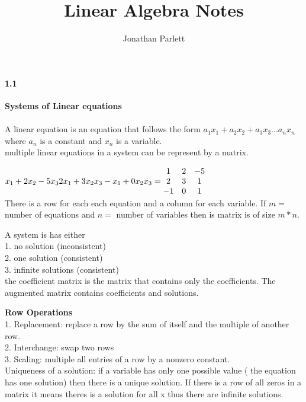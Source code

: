 \documentclass[14pt]{extreport}
\title{Linear Algebra Notes}
\author{Jonathan Parlett}
\begin{document}
\paragraph{1.1}\textbf{Systems of Linear equations}\\\\

A linear equation is an equation that follows the form $a_1x_1 + a_2x_2 + a_3x_3 ... a_nx_n$ where $a_n$ is a constant and $x_n$ is a variable.\\

multiple linear equations in a system can be represent by a matrix.

$
x_1 + 2x_2 -5x_3\\
2x_1 + 3x_2 x_3\\
-x_1 + 0x_2 x_3\\
= 
\begin{matrix}
 1 & 2 & -5\\
 2 & 3 & 1\\
 -1 & 0 & 1\\
 \end{matrix}
$
\\

There is a row for each each equation and a column for each variable. If $m =$ number of equations and $n=$ number of variables then is matrix is of size $m* n$.

A system is has either\\
1. no solution (inconsistent)\\
2. one solution (consistent)\\
3. infinite solutions (consistent)\\


the coefficient matrix is the matrix that contains only the coefficients. The augmented matrix contains coefficients and solutions.

\textbf{Row Operations}\\
1. Replacement: replace a row by the sum of itself and the multiple of another row.\\
2. Interchange: swap two rows\\
3. Scaling: multiple all entries of a row by a nonzero constant.\\

Uniqueness of a solution: if a variable has only one possible value ( the equation has one solution) then there is a unique solution. If there is a row of all zeros in a matrix it means theres is a solution for all x thus there are infinite solutions.
\end{document}
